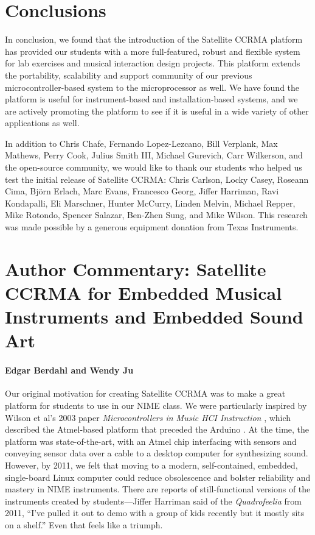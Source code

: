 \section{Conclusions}
In conclusion, we found that the introduction of the Satellite CCRMA platform has provided our students with a more full-featured, robust and flexible system for lab exercises and musical interaction design projects. This platform extends the portability, scalability and support community of our previous microcontroller-based system to the microprocessor as well. We have found the platform is useful for instrument-based and installation-based systems, and we are actively promoting the platform to see if it is useful in a wide variety of other applications as well. 


\begin{acknowledgement}
In addition to Chris Chafe, Fernando Lopez-Lezcano, Bill Verplank, Max Mathews, Perry Cook, Julius Smith III, Michael Gurevich, Carr Wilkerson, and the open-source community, we would like to thank our students who helped us test the initial release of Satellite CCRMA: Chris Carlson, Locky Casey, Roseann Cima, Bj\"orn Erlach, Marc Evans, Francesco Georg, Jiffer Harriman, Ravi Kondapalli, Eli Marschner, Hunter McCurry, Linden Melvin, Michael Repper, Mike Rotondo, Spencer Salazar, Ben-Zhen Sung, and Mike Wilson. This research was made possible by a generous equipment donation from Texas Instruments.
\end{acknowledgement}


\section*{Author Commentary: Satellite CCRMA for Embedded Musical Instruments and Embedded Sound Art}

\paragraph{Edgar Berdahl and Wendy Ju}

Our original motivation for creating Satellite CCRMA was to make a great platform for students to use in our NIME class.
We were particularly inspired by Wilson et al's 2003 paper \textit{Microcontrollers in Music HCI Instruction} \cite{Wilson:2003},
which described the Atmel-based platform that preceded the Arduino \cite{Banzi:2009}. At the time, the platform was state-of-the-art,
with an Atmel chip interfacing with sensors and conveying sensor data over a cable to a desktop computer for
synthesizing sound. However, by 2011, we felt that moving to a modern, self-contained, embedded, single-board Linux
computer could reduce obsolescence and bolster reliability and mastery in NIME instruments. There are reports of
still-functional versions of the instruments created by students---Jiffer Harriman said of the \textit{Quadrofeelia}
from 2011, ``I've pulled it out to demo with a group of kids recently but it mostly sits on a shelf.'' Even that feels like a triumph.

